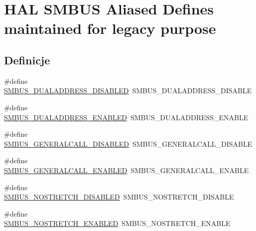 \hypertarget{group___h_a_l___s_m_b_u_s___aliased___defines}{}\section{H\+AL S\+M\+B\+US Aliased Defines maintained for legacy purpose}
\label{group___h_a_l___s_m_b_u_s___aliased___defines}
\subsection*{Definicje}
\begin{DoxyCompactItemize}
\item 
\#define \hyperlink{group___h_a_l___s_m_b_u_s___aliased___defines_gaddbad34ded349c11686df6c08aa6471a}{S\+M\+B\+U\+S\+\_\+\+D\+U\+A\+L\+A\+D\+D\+R\+E\+S\+S\+\_\+\+D\+I\+S\+A\+B\+L\+ED}~S\+M\+B\+U\+S\+\_\+\+D\+U\+A\+L\+A\+D\+D\+R\+E\+S\+S\+\_\+\+D\+I\+S\+A\+B\+LE
\item 
\#define \hyperlink{group___h_a_l___s_m_b_u_s___aliased___defines_ga40e0af7474fce8b9658f0bb0bd5dcdb5}{S\+M\+B\+U\+S\+\_\+\+D\+U\+A\+L\+A\+D\+D\+R\+E\+S\+S\+\_\+\+E\+N\+A\+B\+L\+ED}~S\+M\+B\+U\+S\+\_\+\+D\+U\+A\+L\+A\+D\+D\+R\+E\+S\+S\+\_\+\+E\+N\+A\+B\+LE
\item 
\#define \hyperlink{group___h_a_l___s_m_b_u_s___aliased___defines_gac6c7ef3413e8533e140fda0f1c882a0e}{S\+M\+B\+U\+S\+\_\+\+G\+E\+N\+E\+R\+A\+L\+C\+A\+L\+L\+\_\+\+D\+I\+S\+A\+B\+L\+ED}~S\+M\+B\+U\+S\+\_\+\+G\+E\+N\+E\+R\+A\+L\+C\+A\+L\+L\+\_\+\+D\+I\+S\+A\+B\+LE
\item 
\#define \hyperlink{group___h_a_l___s_m_b_u_s___aliased___defines_ga395828b6264255bd2a51c17f3b473fea}{S\+M\+B\+U\+S\+\_\+\+G\+E\+N\+E\+R\+A\+L\+C\+A\+L\+L\+\_\+\+E\+N\+A\+B\+L\+ED}~S\+M\+B\+U\+S\+\_\+\+G\+E\+N\+E\+R\+A\+L\+C\+A\+L\+L\+\_\+\+E\+N\+A\+B\+LE
\item 
\#define \hyperlink{group___h_a_l___s_m_b_u_s___aliased___defines_ga4fd6421c8f8dbb020249f49dd45a786e}{S\+M\+B\+U\+S\+\_\+\+N\+O\+S\+T\+R\+E\+T\+C\+H\+\_\+\+D\+I\+S\+A\+B\+L\+ED}~S\+M\+B\+U\+S\+\_\+\+N\+O\+S\+T\+R\+E\+T\+C\+H\+\_\+\+D\+I\+S\+A\+B\+LE
\item 
\#define \hyperlink{group___h_a_l___s_m_b_u_s___aliased___defines_gac13cdfb033be4b09e90f8d65745d48c2}{S\+M\+B\+U\+S\+\_\+\+N\+O\+S\+T\+R\+E\+T\+C\+H\+\_\+\+E\+N\+A\+B\+L\+ED}~S\+M\+B\+U\+S\+\_\+\+N\+O\+S\+T\+R\+E\+T\+C\+H\+\_\+\+E\+N\+A\+B\+LE
\item 

\end{DoxyCompactItemize}
